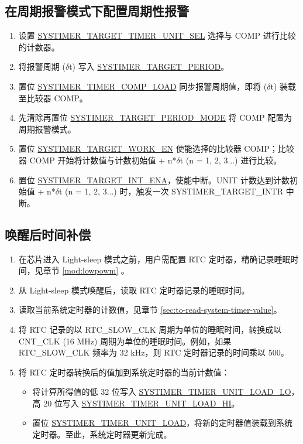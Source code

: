 \documentclass[main\_\_CN.tex]{subfiles}
\begin{document}
\subsection{在周期报警模式下配置周期性报警}
\begin{enumerate}
    \item 设置 \hyperref[fielddesc:SYSTIMERTARGET0TIMERUNITSEL]{SYSTIMER\_TARGET\_TIMER\_UNIT\_SEL} 选择与 COMP 进行比较的计数器。
    \item 将报警周期 ($\delta$t) 写入 \hyperref[fielddesc:SYSTIMERTARGET0PERIOD]{SYSTIMER\_TARGET\_PERIOD}。
    \item 置位 \hyperref[fielddesc:SYSTIMERTIMERCOMP0LOAD]{SYSTIMER\_TIMER\_COMP\_LOAD} 同步报警周期值，即将 ($\delta$t) 装载至比较器 COMP。
    \item 先清除再置位 \hyperref[fielddesc:SYSTIMERTARGET0PERIODMODE]{SYSTIMER\_TARGET\_PERIOD\_MODE} 将 COMP 配置为周期报警模式。
    \item 置位 \hyperref[fielddesc:SYSTIMERTARGET0WORKEN]{SYSTIMER\_TARGET\_WORK\_EN} 使能选择的比较器 COMP；比较器 COMP 开始将计数值与计数初始值 + n*$\delta$t (n = 1, 2, 3...) 进行比较。
    \item 置位 \hyperref[fielddesc:SYSTIMERTARGET0INTENA]{SYSTIMER\_TARGET\_INT\_ENA}，使能中断。UNIT 计数达到计数初始值 + n*$\delta$t (n = 1, 2, 3...) 时，触发一次 SYSTIMER\_TARGET\_INTR 中断。
\end{enumerate}


\subsection{唤醒后时间补偿}
\begin{enumerate}
    \item 在芯片进入 Light-sleep 模式之前，用户需配置 RTC 定时器，精确记录睡眠时间，见章节 \ref{mod:lowpowm} \textit{}。
    \item 从 Light-sleep 模式唤醒后，读取 RTC 定时器记录的睡眠时间。
    \item 读取当前系统定时器的计数值，见章节  \ref{sec:to-read-system-timer-value}。
    \item 将 RTC 记录的以 RTC\_SLOW\_CLK 周期为单位的睡眠时间，转换成以 CNT\_CLK (16 MHz) 周期为单位的睡眠时间。例如，如果 RTC\_SLOW\_CLK 频率为 32 kHz，则 RTC 定时器记录的时间乘以 500。
    \item 将 RTC 定时器转换后的值加到系统定时器的当前计数值：
    \begin{itemize}
        \item 将计算所得值的低 32 位写入 \hyperref[fielddesc:SYSTIMERTIMERUNIT0LOADLO]{SYSTIMER\_TIMER\_UNIT\_LOAD\_LO}，高 20 位写入 \hyperref[fielddesc:SYSTIMERTIMERUNIT0LOADHI]{SYSTIMER\_TIMER\_UNIT\_LOAD\_HI}。
        \item 置位 \hyperref[fielddesc:SYSTIMERTIMERUNIT0LOAD]{SYSTIMER\_TIMER\_UNIT\_LOAD}，将新的定时器值装载到系统定时器。至此，系统定时器更新完成。
        \end{itemize}
\end{enumerate}
\end{document}
